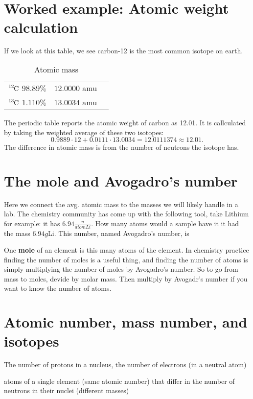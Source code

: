 \section{Worked example: Atomic weight calculation}%
\label{sec:worked_example_atomic_weight_calculation}

If we look at this table, we see carbon-12 is the most common isotope on earth.
\begin{table}[htpb]
	\centering
	\caption{Atomic mass}
	\label{tab:Atomic mass}
	\begin{tabular}{c l r}
	$\ce{^{12}_{}C}$ $98.89\%$ & $12.0000$ amu \\
	$\ce{^{13}_{}C}$ $1.110\%$ & $13.0034$ amu
	\end{tabular}
\end{table}

The periodic table reports the atomic weight of carbon as 12.01. It is callculated
by taking the weighted average of these two isotopes: \[
0.9889 \cdot 12 + 0.0111 \cdot 13.0034 = 12.0111374 \approx 12.01
.\]
The difference in atomic mass is from the number of neutrons the isotope has.

\section{The mole and Avogadro's number}%
\label{sec:the_mole_and_avogadro_s_number}

Here we connect the avg. atomic mass to the masses we will likely handle in a lab.
The chemistry community has come up with the following tool, take Lithium for example:
it has $6.94 \frac{u}{atom Li}$. How many atoms would a sample have it it had the mass
$ 6.94 g$Li. This number, named Avogadro's number, is

One \textbf{mole} of an element is this many atoms of the element. In chemistry practice
finding the number of moles is a useful thing, and finding the number of atoms is
simply multiplying the number of moles by Avogadro's number. So to go from mass to
moles, devide by molar mass. Then multiply by Avogadr's number if you want to know the
number of atoms.

\section{Atomic number, mass number, and isotopes}%
\label{sec:atomic_number_mass_number_and_isotopes}

\begin{definition}
	The number of protons in a nucleus, the number of
	electrons (in a neutral atom)
\end{definition}
\begin{definition}[isotope]
	atoms of a single element (same atomic number) that differ
	in the number of neutrons in their nuclei (different masses)
\end{definition}








\newpage


